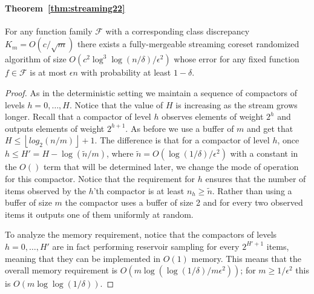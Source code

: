 \documentclass[anon,12pt]{colt2019} %
\newcommand{\eps}{\epsilon}
\newcommand{\F}{\mathcal{F}}
\newcommand{\floor}[1]{\left \lfloor #1 \right \rfloor}
\begin{document}
\paragraph{Theorem~\ref{thm:streaming22}}
For any function family $\F$ with a corresponding class discrepancy $K_m = O(c/\sqrt{m})$ there exists a fully-mergeable streaming coreset randomized algorithm of size $O\left(c^2\log^3\log(n/\delta) /\eps^2\right)$ whose error for any fixed function $f \in \F$ is at most $\eps n$ with probability at least $1-\delta$. 
\begin{proof}
As in the deterministic setting we maintain a sequence of compactors of levels $h=0,\ldots,H$. Notice that the value of $H$ is increasing as the stream grows longer. Recall that a compactor of level $h$ observes elements of weight $2^h$ and outputs elements of weight $2^{h+1}$. As before we use a buffer of $m$ and get that $H \leq  \floor{log_2(n/m)}+1$.
The difference is that for a compactor of level $h$, once $h \leq H' = H - \log(\tilde{n}/m)$, where $\tilde{n} = O(\log(1/\delta)/\eps^2)$ with a constant in the $O()$ term that will be determined later, we change the mode of operation for this compactor. Notice that the requirement for $h$ ensures that the number of items observed by the $h$'th compactor is at least $n_h \geq \tilde{n}$. Rather than using a buffer of size $m$ the compactor uses a buffer of size 2 and for every two observed items it outputs one of them uniformly at random.

To analyze the memory requirement, notice that the compactors of levels $h=0,\ldots,H'$ are in fact performing reservoir sampling for every $2^{H'+1}$ items, meaning that they can be implemented in $O(1)$ memory. This means that the overall memory requirement is $O(m\log(\log(1/\delta)/m\eps^2))$; for $m \geq 1/\eps^2$ this is $O(m\log\log(1/\delta))$. 


\end{proof}
\end{document}
